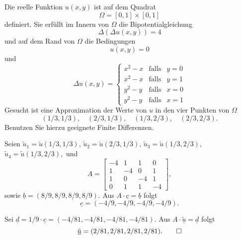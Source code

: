Die reelle Funktion $u(x,y)$ ist auf dem Quadrat
\[
\Omega = [0, 1] \times [0,1]
\]
definiert. Sie erfüllt im Innern von $\Omega$ die Bipotentialgleichung
\[
\Delta ( \Delta u(x,y)) = 4
\]
und auf dem Rand von $\Omega$ die Bedingungen
\[
u(x,y) = 0
\]
und
\[
\Delta u(x,y)
=
\left\{
\begin{array}{ccl}
x^2 - x & \text{falls} & y = 0 \\
x^2 - x & \text{falls} & y = 1 \\
y^2 - y & \text{falls} & x = 0 \\
y^2 - y & \text{falls} & x = 1
\end{array} \right.
\]
Gesucht ist eine Approximation der Werte von $u$ in den vier Punkten von
$\Omega$
\[
(1/3,1/3), \quad  (2/3,1/3), \quad (1/3,2/3), \quad (2/3, 2/3).
\]
Benutzen Sie hierzu geeignete Finite Differenzen.

\begin{loesung}
Seien
$
\tilde u_1
=
\tilde u(1/3,1/3)
$,
$
\tilde u_2
=
\tilde u(2/3,1/3)
$,
$
\tilde u_3
=
\tilde u(1/3,2/3)$,
$
\tilde u_4
=
\tilde u(1/3,2/3),
$
und
\[
A = \left[\begin{array}{rrrr} 
-4  & 1  & 1 & 0 \\
 1 & -4 & 0 & 1 \\
 1 & 0 & -4 & 1 \\ 
 0 & 1 & 1  & -4  \end{array}\right],
\]
sowie
$\underline b = (8/9, 8/9, 8/9, 8/9)$.
Aus $A \cdot \underline{c} = \underline{b}$ folgt
\[
\underline{c} = (-4/9, -4/9, -4/9, - 4/9).
\]

Sei $\underline d = 1/9 \cdot \underline c = (-4/81, -4/81, -4/81, - 4/81)$.
Aus $A \cdot \underline{\tilde u} = \underline{d}$ folgt
\[
\underline{\tilde u} = (2/81, 2/81, 2/81, 2/81).
\qedhere
\]
\end{loesung}


